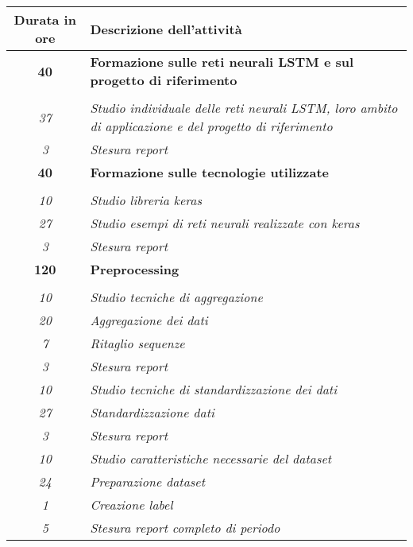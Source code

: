 

\begin{tabularx}{\textwidth}{|c|X|}
	\hline
	\textbf{Durata in ore} & \textbf{Descrizione dell'attività} \\\hline
	
	\textbf{40} & \textbf{Formazione sulle reti neurali LSTM e sul progetto di riferimento} \\	 \hdashline 
	\multirow{3}{0cm}\\ 
    \textit{37} & 
    \textit{Studio individuale delle reti neurali LSTM, loro ambito di applicazione e del progetto di riferimento} \\
    \textit{3} & 
    \textit{Stesura report} \\
    \hline
    \hline
   
    \textbf{40} & \textbf{Formazione sulle tecnologie utilizzate} \\ \hdashline 
    \multirow{3}{0cm}\\ 
    \textit{10} & 
    \textit{Studio libreria keras} \\
    \textit{27} & 
    \textit{Studio esempi di reti neurali realizzate con keras} \\
	\textit{3} & 
    \textit{Stesura report} \\
    \hline
    \hline
    \textbf{120} & \textbf{Preprocessing}  \\ \hdashline 
    \multirow{4}{0cm}\\ 
    \textit{10} & 
    \textit{Studio tecniche di aggregazione} \\
	\textit{20} & 
    \textit{Aggregazione dei dati} \\
	\textit{7} & 
    \textit{Ritaglio sequenze} \\
	\textit{3} & 
    \textit{Stesura report} \\ \hdashline 
    \textit{10} & 
    \textit{Studio tecniche di standardizzazione dei dati} \\
	\textit{27} & 
    \textit{Standardizzazione dati} \\
	\textit{3} & 
    \textit{Stesura report} \\ \hdashline 
    \textit{10} & 
    \textit{Studio caratteristiche necessarie del dataset} \\
	\textit{24} & 
    \textit{Preparazione dataset} \\
	\textit{1} & 
    \textit{Creazione label} \\
	\textit{5} & 
    \textit{Stesura report completo di periodo} \\
	

\end{tabularx}
